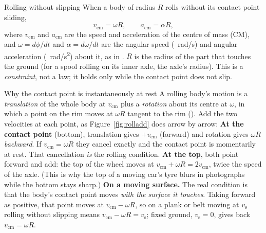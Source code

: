 \begin{defbox}{Rolling without slipping}
When a body of radius $R$ rolls without its contact point sliding,
\[
v_{\text{cm}}=\omega R,\qquad a_{\text{cm}}=\alpha R,
\]
where $v_{\text{cm}}$ and $a_{\text{cm}}$ are the speed and acceleration of the centre of mass (CM), and
$\omega=d\phi/dt$ and $\alpha=d\omega/dt$ are the angular speed (\SI{}{rad/s}) and angular acceleration
(\SI{}{rad/s^2}) about it, as in . $R$ is the radius of the part that touches the ground (for
a spool rolling on its inner axle, the axle's radius). This is a \emph{constraint}, not a law; it holds only
while the contact point does not slip.
\end{defbox}

\begin{derivbox}{Why the contact point is instantaneously at rest}
A rolling body's motion is a \emph{translation} of the whole body at $v_{\text{cm}}$ plus a
\emph{rotation} about its centre at $\omega$, in which a point on the rim moves at $\omega R$ tangent to the rim
(). Add the two velocities at each point, as Figure~\ref{fig:rolladd} does arrow by arrow:
 \textbf{At the contact point} (bottom), translation gives $+v_{\text{cm}}$ (forward) and
rotation gives $\omega R$ \emph{backward}. If $v_{\text{cm}}=\omega R$ they cancel exactly and the
contact point is momentarily at rest. That cancellation \emph{is} the rolling condition.
 \textbf{At the top}, both point forward and add: the top of the wheel moves at
$v_{\text{cm}}+\omega R=2v_{\text{cm}}$, twice the speed of the axle. (This is why the top of a moving
car's tyre blurs in photographs while the bottom stays sharp.)
 \textbf{On a moving surface.} The real condition is that the body's contact point moves
\emph{with the surface it touches}. Taking forward as positive, that point moves at $v_{\text{cm}}-\omega R$,
so on a plank or belt moving at $v_{\text{s}}$ rolling without slipping means $v_{\text{cm}}-\omega R=v_{\text{s}}$;
fixed ground, $v_{\text{s}}=0$, gives back $v_{\text{cm}}=\omega R$.
\end{derivbox}

\begin{figure}[htbp]
\centering
{}
\end{figure}

